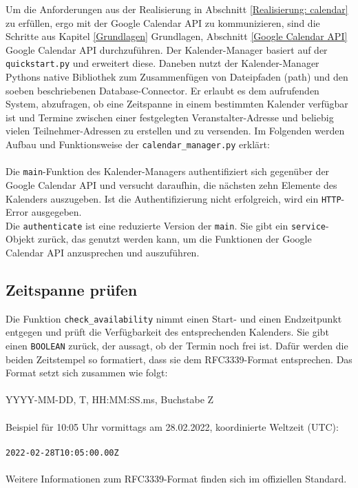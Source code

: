         \label{Implementierung: calendar_manager.py}
        Um die Anforderungen aus der Realisierung in Abschnitt \ref*{Realisierung: calendar} zu erfüllen, ergo mit der Google Calendar API zu kommunizieren, sind die Schritte aus Kapitel \ref*{Grundlagen} Grundlagen, Abschnitt \ref*{Google Calendar API} Google Calendar API durchzuführen. Der Kalender-Manager basiert auf der \verb|quickstart.py| und erweitert diese. Daneben nutzt der Kalender-Manager Pythons native Bibliothek zum Zusammenfügen von Dateipfaden (path) und den soeben beschriebenen Database-Connector. Er erlaubt es dem aufrufenden System, abzufragen, ob eine Zeitspanne in einem bestimmten Kalender verfügbar ist und Termine zwischen einer festgelegten Veranstalter-Adresse und beliebig vielen Teilnehmer-Adressen zu erstellen und zu versenden. Im Folgenden werden Aufbau und Funktionsweise der \verb|calendar_manager.py| erklärt: \\ 
        \\
        Die \verb|main|-Funktion des Kalender-Managers authentifiziert sich gegenüber der Google Calendar API und versucht daraufhin, die nächsten zehn Elemente des Kalenders auszugeben. Ist die Authentifizierung nicht erfolgreich, wird ein \verb|HTTP|-Error ausgegeben.  \\
        Die \verb|authenticate| ist eine reduzierte Version der \verb|main|. Sie gibt ein \verb|service|-Objekt zurück, das genutzt werden kann, um die Funktionen der Google Calendar API anzusprechen und auszuführen.\\
        
        \subsection{Zeitspanne prüfen}
            Die Funktion \verb|check_availability| nimmt einen Start- und einen Endzeitpunkt entgegen und prüft die Verfügbarkeit des entsprechenden Kalenders. Sie gibt einen \verb|BOOLEAN| zurück, der aussagt, ob der Termin noch frei ist. Dafür werden die beiden Zeitstempel so formatiert, dass sie dem RFC3339-Format entsprechen. Das Format setzt sich zusammen wie folgt: \\
            \\
            YYYY-MM-DD, \glq T\grq, HH:MM:SS.ms, Buchstabe \glq Z\grq \\
            \\
            Beispiel für 10:05 Uhr vormittags am 28.02.2022, koordinierte Weltzeit (UTC): \\
            \\
            \verb/2022-02-28T10:05:00.00Z/ \\
            \\
            Weitere Informationen zum RFC3339-Format finden sich im offiziellen Standard. \cite{date_time} \\
            
